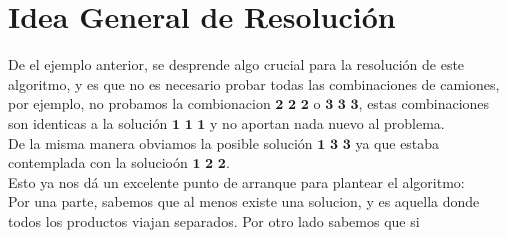 \section{Idea General de Resoluci\'on}
De el ejemplo anterior, se desprende algo crucial para la resoluci\'on de este algoritmo, y es que no es necesario probar todas las combinaciones de camiones, por ejemplo, no probamos la combionacion $\textbf{2 2 2}$ o $\textbf{3 3 3}$, estas combinaciones son identicas a la soluci\'on $\textbf{1 1 1}$ y no aportan nada nuevo al problema.
\\
De la misma manera obviamos la posible soluci\'on $\textbf{1 3 3}$ ya que estaba contemplada con la solucio\'on $\textbf{1 2 2}$.
\\
Esto ya nos d\'a un excelente punto de arranque para plantear el algoritmo:
\\
Por una parte, sabemos que al menos existe una solucion, y es aquella donde todos los productos viajan separados. Por otro lado sabemos que si 